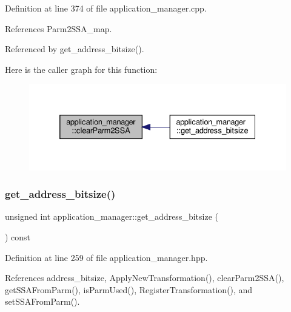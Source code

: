 Definition at line 374 of file application\+\_\+manager.\+cpp.



References Parm2\+S\+S\+A\+\_\+map.



Referenced by get\+\_\+address\+\_\+bitsize().

Here is the caller graph for this function\+:
\nopagebreak
\begin{figure}[H]
\begin{center}
\leavevmode
\includegraphics[width=332pt]{dc/db5/classapplication__manager_ad03a2ed8cf0cdfabcbc8cb903c4d12f1_icgraph}
\end{center}
\end{figure}
\mbox{\label{classapplication__manager_a1edba5434f8e815cf9339be509af0d52}} 
\subsubsection{\texorpdfstring{get\+\_\+address\+\_\+bitsize()}{get\_address\_bitsize()}}
{\footnotesize\ttfamily unsigned int application\+\_\+manager\+::get\+\_\+address\+\_\+bitsize (\begin{DoxyParamCaption}{ }\end{DoxyParamCaption}) const\hspace{0.3cm}{\ttfamily [inline]}}



Definition at line 259 of file application\+\_\+manager.\+hpp.



References address\+\_\+bitsize, Apply\+New\+Transformation(), clear\+Parm2\+S\+S\+A(), get\+S\+S\+A\+From\+Parm(), is\+Parm\+Used(), Register\+Transformation(), and set\+S\+S\+A\+From\+Parm().

